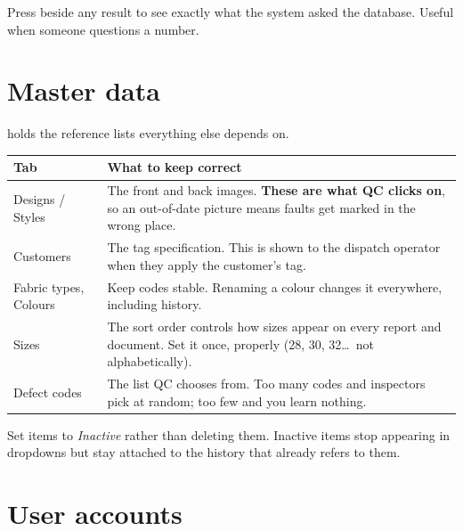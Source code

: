 \begin{tipbox}
Press  beside any result to see exactly what the system asked the
database. Useful when someone questions a number.
\end{tipbox}

\section{Master data}

 holds the reference lists everything else depends on.


\begin{table}[H]
\centering
\small
\begin{tabular}{@{}p{34mm}p{104mm}@{}}
\toprule
\textbf{Tab} & \textbf{What to keep correct} \\
\midrule
Designs / Styles &
  The front and back images. \textbf{These are what QC clicks on}, so an
  out-of-date picture means faults get marked in the wrong place. \\
Customers &
  The tag specification. This is shown to the dispatch operator when they apply
  the customer's tag. \\
Fabric types, Colours &
  Keep codes stable. Renaming a colour changes it everywhere, including history. \\
Sizes &
  The sort order controls how sizes appear on every report and document. Set it
  once, properly (28, 30, 32\ldots\ not alphabetically). \\
Defect codes &
  The list QC chooses from. Too many codes and inspectors pick at random; too
  few and you learn nothing. \\
\bottomrule
\end{tabular}
\end{table}


\begin{warnbox}
Set items to \emph{Inactive} rather than deleting them. Inactive items stop
appearing in dropdowns but stay attached to the history that already refers to
them.
\end{warnbox}

\section{User accounts}

